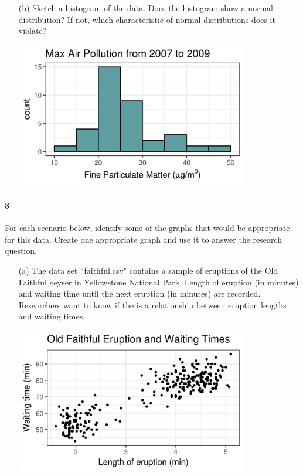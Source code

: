 \documentclass{article}
\begin{document}
\begin{flushleft}
\begin{itemize}
\vspace{.5in}
\item[(b)] Sketch a histogram of the data. Does the histogram show a normal distribution? If not, which characteristic of normal distributions does it violate?\\
\bigskip
{}
\bigskip

{\centering
\includegraphics[width=4in]{images/grp02_Q2_b}
\par}

\end{itemize}


\newpage
\paragraph{3} For each scenario below, identify some of the graphs that would be appropriate for this data. Create one appropriate graph and use it to answer the research question.

\begin{itemize}
\item [(a)] The data set ``faithful.csv" contains a sample of eruptions of the Old Faithful geyser in Yellowstone National Park. Length of eruption (in minutes) and waiting time until the next eruption (in minutes) are recorded. Researchers want to know if the is a relationship between eruption lengths and waiting times.\\
\bigskip
{}
\bigskip

{\centering
\includegraphics[width=4in]{images/grp02_Q3_a}
\par}


\end{itemize}
\end{flushleft}
\end{document}
